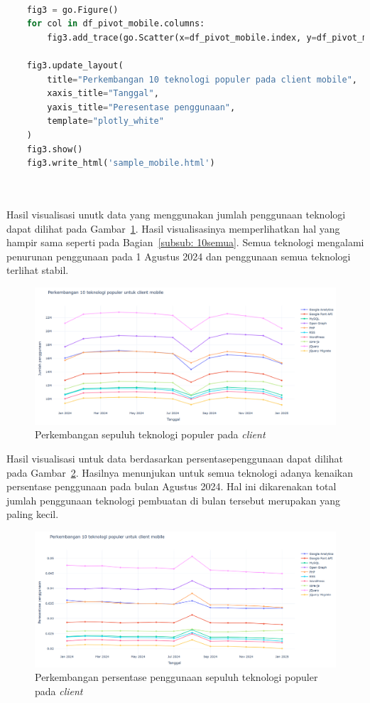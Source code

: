 \begin{lstlisting}[language = Python,caption=Kode untuk membuat visualisasi pada \textit{client} \mobile,label=kode:vismob]

    fig3 = go.Figure()
    for col in df_pivot_mobile.columns:
        fig3.add_trace(go.Scatter(x=df_pivot_mobile.index, y=df_pivot_mobile[col], mode='lines+markers', name=col))
        
    fig3.update_layout(
        title="Perkembangan 10 teknologi populer pada client mobile",
        xaxis_title="Tanggal",
        yaxis_title="Peresentase penggunaan",
        template="plotly_white"
    )
    fig3.show()
    fig3.write_html('sample_mobile.html')

    
\end{lstlisting}

Hasil visualisasi unutk data yang menggunakan jumlah penggunaan teknologi dapat dilihat pada Gambar~\ref{fig:10mobile}. Hasil visualisasinya memperlihatkan hal yang hampir sama seperti pada Bagian~\ref{subsub: 10semua}. Semua teknologi mengalami penurunan penggunaan pada 1 Agustus 2024 dan penggunaan semua teknologi terlihat stabil.
\begin{figure}[H]
    \centering
    \includegraphics[width=0.7\linewidth]{Gambar/perkembangan 10 teknologi mobile.png}
    \caption{Perkembangan sepuluh teknologi populer pada \textit{client} \mobile}
    \label{fig:10mobile}
\end{figure}

Hasil visualisasi untuk data berdasarkan persentasepenggunaan dapat dilihat pada Gambar~\ref{fig:persentmobile}. Hasilnya menunjukan untuk semua teknologi adanya kenaikan persentase penggunaan pada bulan Agustus 2024. Hal ini dikarenakan total jumlah penggunaan teknologi pembuatan \web di bulan tersebut merupakan yang paling kecil.

\begin{figure}
    \centering
    \includegraphics[width=0.7\linewidth]{Gambar/perkembangan persentase mobile.png}
    \caption{Perkembangan persentase penggunaan sepuluh teknologi populer pada \textit{client} \mobile}
    \label{fig:persentmobile}
\end{figure}


